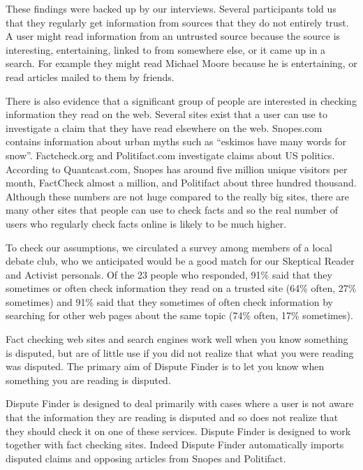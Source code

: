 \documentclass{www2010-submission}
\newcommand{\todo}[1]{}
\begin{document}
These findings were backed up by our interviews. Several participants told us that they regularly get information from sources that they do not entirely trust. A user might read information from an untrusted source because the source is interesting, entertaining, linked to from somewhere else, or it came up in a search. For example they might read Michael Moore because he is entertaining, or read articles mailed to them by friends. 

\todo{Talk about people reading from a wide range of sources.}

There is also evidence that a significant group of people are interested in checking information they read on the web. Several sites exist that a user can use to investigate a claim that they have read elsewhere on the web. Snopes.com contains information about urban myths such as ``eskimos have many words for snow''. Factcheck.org and Politifact.com investigate claims about US politics. According to Quantcast.com, Snopes has around five million unique visitors per month, FactCheck almost a million, and Politifact about three hundred thousand. Although these numbers are not huge compared to the really big sites, there are many other sites that people can use to check facts and so the real number of users who regularly check facts online is likely to be much higher. 

To check our assumptions, we circulated a survey among members of a local debate club, who we anticipated would be a good match for our Skeptical Reader and Activist personals. Of the 23 people who responded, 91\% said that they sometimes or often check information they read on a trusted site (64\% often, 27\% sometimes) and 91\% said that they sometimes of often check information by searching for other web pages about the same topic (74\% often, 17\% sometimes).

\todo{Talk about our survey}

Fact checking web sites and search engines work well when you know something is disputed, but are of little use if you did not realize that what you were reading was disputed. The primary aim of Dispute Finder is to let you know when something you are reading is disputed.

Dispute Finder is designed to deal primarily with cases where a user is not aware that the information they are reading is disputed and so does not realize that they should check it on one of these services. Dispute Finder is designed to work together with fact checking sites. Indeed Dispute Finder automatically imports disputed claims and opposing articles from Snopes and Politifact.
\end{document}
